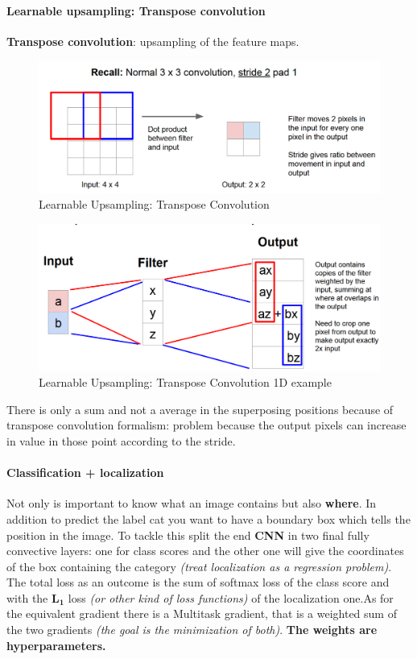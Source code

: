 \documentclass[11pt]{article}
\begin{document}
\paragraph{Learnable upsampling: Transpose convolution}
\textbf{Transpose convolution}: upsampling of the feature maps.
\begin{figure}[h]
\centering
\captionsetup{justification=centering}
\includegraphics[width=1\linewidth]{L1013.pdf}
\caption{ Learnable Upsampling: Transpose Convolution}
\label{fig:L1013}
\end{figure}
\clearpage
\begin{figure}[h]
\centering
\captionsetup{justification=centering}
\includegraphics[width=0.9\linewidth]{L1014.pdf}
\caption{ Learnable Upsampling: Transpose Convolution 1D example}
\label{fig:L1014}
\end{figure}
There is only a sum and not a average in the superposing positions because of transpose convolution formalism: problem because the output pixels can increase in value in those point according to the stride.
\paragraph{Classification + localization}
Not only is important to know what an image contains but also \textbf{where}. In addition to  predict the label cat you want to have a boundary box which tells the position in the image. To tackle this split the end \textbf{CNN} in two final fully convective layers: one for class scores and the other one will give the coordinates of the box containing the category
\textit{(treat localization as a regression problem)}. The total loss as an outcome is the sum of softmax loss of the class score and with the $\mathbf{L_1}$ loss \textit{(or other kind of loss functions)} of the localization one.As for the equivalent gradient there is a Multitask gradient, that is a weighted sum of the two gradients \textit{(the goal is the minimization of both)}. \textbf{The weights are hyperparameters.}
\end{document}
